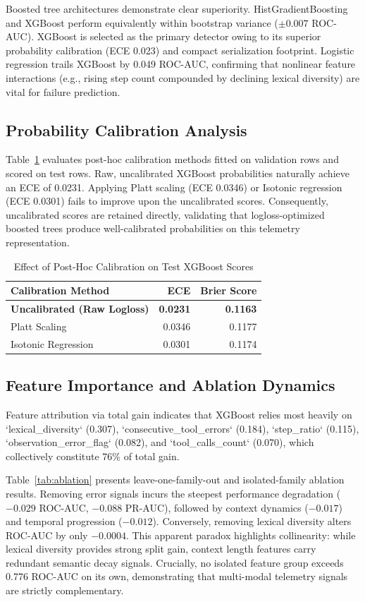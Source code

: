 \documentclass[journal,compsoc]{IEEEtran}
\begin{document}
Boosted tree architectures demonstrate clear superiority. HistGradientBoosting and XGBoost perform equivalently within bootstrap variance ($\pm 0.007$ ROC-AUC). XGBoost is selected as the primary detector owing to its superior probability calibration (ECE 0.023) and compact serialization footprint. Logistic regression trails XGBoost by 0.049 ROC-AUC, confirming that nonlinear feature interactions (e.g., rising step count compounded by declining lexical diversity) are vital for failure prediction.

\subsection{Probability Calibration Analysis}
Table~\ref{tab:calibration} evaluates post-hoc calibration methods fitted on validation rows and scored on test rows. Raw, uncalibrated XGBoost probabilities naturally achieve an ECE of 0.0231. Applying Platt scaling (ECE 0.0346) or Isotonic regression (ECE 0.0301) fails to improve upon the uncalibrated scores. Consequently, uncalibrated scores are retained directly, validating that logloss-optimized boosted trees produce well-calibrated probabilities on this telemetry representation.

\begin{table}[h]
\centering
\caption{Effect of Post-Hoc Calibration on Test XGBoost Scores}
\label{tab:calibration}
\begin{tabular}{@{}lrr@{}}
\toprule
\textbf{Calibration Method} & \textbf{ECE} & \textbf{Brier Score} \\ \midrule
\textbf{Uncalibrated (Raw Logloss)} & \textbf{0.0231} & \textbf{0.1163} \\
Platt Scaling & 0.0346 & 0.1177 \\
Isotonic Regression & 0.0301 & 0.1174 \\ \bottomrule
\end{tabular}
\end{table}

\subsection{Feature Importance and Ablation Dynamics}
Feature attribution via total gain indicates that XGBoost relies most heavily on `lexical_diversity` (0.307), `consecutive_tool_errors` (0.184), `step_ratio` (0.115), `observation_error_flag` (0.082), and `tool_calls_count` (0.070), which collectively constitute 76\% of total gain.

Table~\ref{tab:ablation} presents leave-one-family-out and isolated-family ablation results. Removing error signals incurs the steepest performance degradation ($-0.029$ ROC-AUC, $-0.088$ PR-AUC), followed by context dynamics ($-0.017$) and temporal progression ($-0.012$). Conversely, removing lexical diversity alters ROC-AUC by only $-0.0004$. This apparent paradox highlights collinearity: while lexical diversity provides strong split gain, context length features carry redundant semantic decay signals. Crucially, no isolated feature group exceeds 0.776 ROC-AUC on its own, demonstrating that multi-modal telemetry signals are strictly complementary.
\end{document}
